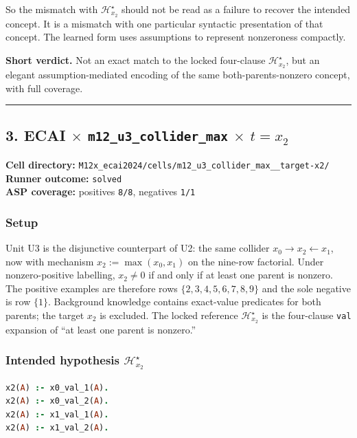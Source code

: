 \documentclass[11pt]{article}
\begin{document}
So the mismatch with \(\mathcal{H}_{x_2}^\star\) should not be read as a failure to recover the intended concept. It is a mismatch with one particular syntactic presentation of that concept. The learned form uses assumptions to represent nonzeroness compactly.

\textbf{Short verdict.} Not an exact match to the locked four-clause \(\mathcal{H}_{x_2}^\star\), but an elegant assumption-mediated encoding of the same both-parents-nonzero concept, with full coverage.

\medskip\hrule\medskip

\subsection{\texorpdfstring{3. ECAI \(\times\) \texttt{m12\_u3\_collider\_max} \(\times\) \(t=x_2\)}{3. ECAI - m12-u3-collider-max - target x2}}

\textbf{Cell directory:} \texttt{M12x\_ecai2024/cells/m12\_u3\_collider\_max\_\_target-x2/}\\
\textbf{Runner outcome:} \texttt{solved}\\
\textbf{ASP coverage:} positives \texttt{8/8}, negatives \texttt{1/1}

\subsubsection{Setup}

Unit U3 is the disjunctive counterpart of U2: the same collider \(x_0\to x_2\leftarrow x_1\), now with mechanism \(x_2:=\max(x_0,x_1)\) on the nine-row factorial. Under nonzero-positive labelling, \(x_2\neq 0\) if and only if at least one parent is nonzero. The positive examples are therefore rows \(\{2,3,4,5,6,7,8,9\}\) and the sole negative is row \(\{1\}\). Background knowledge contains exact-value predicates for both parents; the target \(x_2\) is excluded. The locked reference \(\mathcal{H}_{x_2}^\star\) is the four-clause \texttt{val} expansion of ``at least one parent is nonzero.''

\subsubsection{\texorpdfstring{Intended hypothesis \(\mathcal{H}_{x_2}^\star\)}{Intended hypothesis H-star(x2)}}

\begin{lstlisting}[style=logic,language=Prolog]
x2(A) :- x0_val_1(A).
x2(A) :- x0_val_2(A).
x2(A) :- x1_val_1(A).
x2(A) :- x1_val_2(A).
\end{lstlisting}
\end{document}
